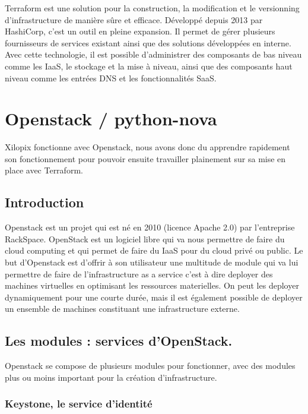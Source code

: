 \documentclass[]{article}
\begin{document}
Terraform est une solution pour la construction, la modification et le
versionning d'infrastructure de manière sûre et efficace. Développé
depuis 2013 par HashiCorp, c'est un outil en pleine expansion. Il permet
de gérer plusieurs fournisseurs de services existant ainsi que des
solutions développées en interne. Avec cette technologie, il est
possible d'administrer des composants de bas niveau comme les IaaS, le
stockage et la mise à niveau, ainsi que des composants haut niveau comme
les entrées DNS et les fonctionnalités SaaS.

\section{Openstack / python-nova}\label{openstack-python-nova}

Xilopix fonctionne avec Openstack, nous avons donc du apprendre
rapidement son fonctionnement pour pouvoir ensuite travailler plainement
sur sa mise en place avec Terraform.

\subsection{Introduction}\label{introduction-1}

Openstack est un projet qui est né en 2010 (licence Apache 2.0) par
l'entreprise RackSpace. OpenStack est un logiciel libre qui va nous
permettre de faire du cloud computing et qui permet de faire du IaaS
pour du cloud privé ou public. Le but d'Openstack est d'offrir à son
utilisateur une multitude de module qui va lui permettre de faire de
l'infrastructure as a service c'est à dire deployer des machines
virtuelles en optimisant les ressources materielles. On peut les
deployer dynamiquement pour une courte durée, mais il est également
possible de deployer un ensemble de machines constituant une
infrastructure externe.

\subsection{Les modules : services
d'OpenStack.}\label{les-modules-services-dopenstack.}

Openstack se compose de plusieurs modules pour fonctionner, avec des
modules plus ou moins important pour la création d'infrastructure.

\subsubsection{Keystone, le service
d'identité}\label{keystone-le-service-didentituxe9}
\end{document}
